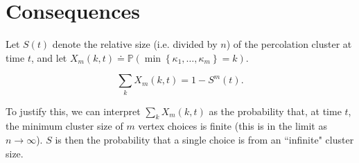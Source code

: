\documentclass[twoside,10pt]{report}
\begin{document}

\section{Consequences}

Let $S(t)$ denote the relative size (i.e. divided by $n$) of the percolation cluster at time $t$, and let $X_{m}(k,t) \doteq \mathbb{P}\left( \min\left\{ \kappa_1, \dots, \kappa_{m} \right\} = k \right) $.
\begin{prop}
	\[
		\sum_{k} X_{m}(k,t) = 1 - S^{m}(t).
	\] 
\end{prop}
	To justify this, we can interpret $\sum_{k}X_{m}(k, t)$ as the probability that, at time $t$, the minimum cluster size of $m$ vertex choices is finite (this is in the limit as $n\to \infty$). $S$ is then the probability that a single choice is from an ``infinite" cluster size. 
\end{document}
